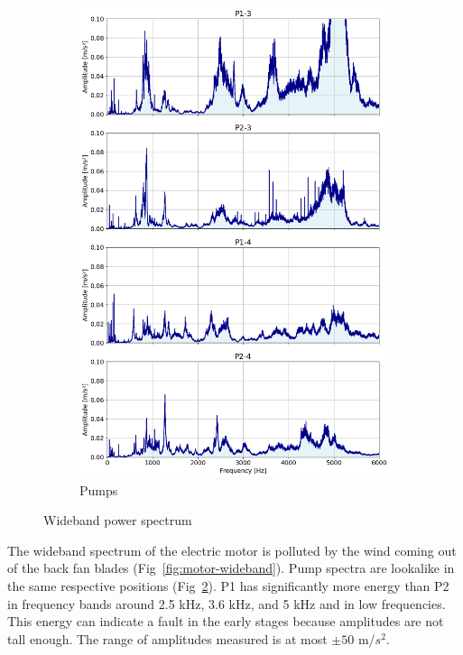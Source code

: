 \documentclass{llncs}
\begin{document}
\begin{figure}
\begin{subfigure}[b]{0.3\textwidth}
         \includegraphics[width=\textwidth]{fig/spectrum/pump-wideband-60s.png}
         \caption{Pumps}
         \label{fig:pump-wideband}
     \end{subfigure}
     \caption{Wideband power spectrum}
\end{figure}

The wideband spectrum of the electric motor is polluted by the wind coming out of the back fan blades (Fig~\ref{fig:motor-wideband}). Pump spectra are lookalike in the same respective positions (Fig~\ref{fig:pump-wideband}). P1 has significantly more energy than P2 in frequency bands around 2.5 kHz, 3.6 kHz, and 5 kHz and in low frequencies. This energy can indicate a fault in the early stages because amplitudes are not tall enough. The range of amplitudes measured is at most $\pm 50$ m/$s^2$.
\end{document}
